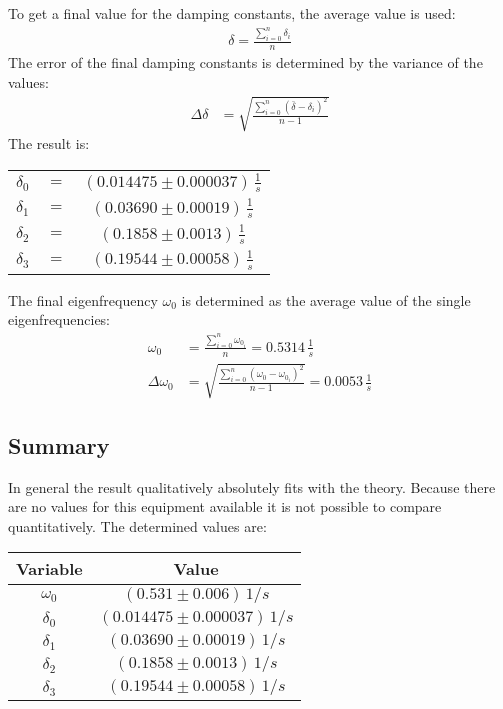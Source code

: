To get a final value for the damping constants, the average value is used:
\begin{align}
\delta = \frac{\sum_{i=0}^n \delta_i}{n}
\end{align}
The error of the final damping constants is determined by the variance of the values:
\begin{align}
\Delta\delta &= \sqrt{\frac{\sum_{i=0}^n \left( \bar{\delta} -\delta_i\right)^2 }{n-1}}
\end{align}
The result is:
\begin{center}
\begin{tabular}{ccc}
\(\delta_0\) & \(=\) &\(\left(0.014475 \pm 0.000037 \right)\, \frac{1}{s}\)\\
\(\delta_1\) & \(=\) &\(\left(0.03690 \pm 0.00019 \right)\, \frac{1}{s}\)\\
\(\delta_2\) & \(=\) &\(\left(0.1858 \pm 0.0013 \right)\, \frac{1}{s}\)\\
\(\delta_3\) & \(=\) &\(\left(0.19544 \pm 0.00058 \right)\, \frac{1}{s}\)
\end{tabular}
\end{center}
The final eigenfrequency \(\omega_0\) is determined as the average value of the single eigenfrequencies:
\begin{align}
\omega_0 &= \frac{\sum_{i=0}^n \omega_{0_i}}{n} = 0.5314 \, \frac{1}{s}\\
\Delta \omega_0 &= \sqrt{\frac{\sum_{i=0}^n \left( \omega_0 -\omega_{0_i}\right)^2 }{n-1}} = 0.0053\, \frac{1}{s}
\end{align}
\subsection{Summary}
In general the result qualitatively absolutely fits with the theory. Because there are no values for this equipment available it 
is not possible to compare quantitatively. The determined values are:
\begin{center}
\begin{tabular}{c|c}
Variable & Value \\\hline
\(\omega_0\) & \(\left(0.531 \pm 0.006 \right)\, 1/s\) \\
\(\delta_0\) &\(\left(0.014475 \pm 0.000037 \right)\, 1/s\)\\
\(\delta_1\) &\(\left(0.03690 \pm 0.00019 \right)\, 1/s\)\\
\(\delta_2\) &\(\left(0.1858 \pm 0.0013 \right)\, 1/s\)\\
\(\delta_3\) &\(\left(0.19544 \pm 0.00058 \right)\, 1/s\)
\end{tabular}
\end{center}